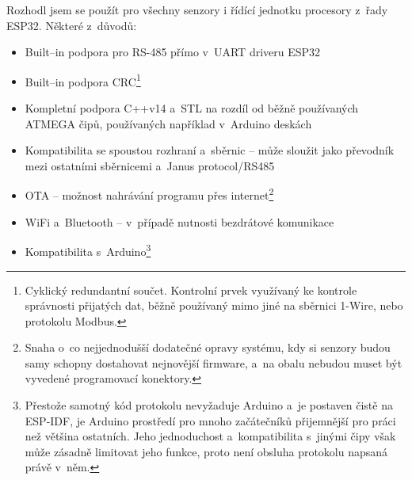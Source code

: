 Rozhodl jsem se použít pro všechny senzory i řídící jednotku procesory z~řady ESP32.
Některé z~důvodů:
\begin{itemize}
    \item Built--in podpora pro RS-485 přímo v~UART driveru ESP32
    \item Built--in podpora CRC\footnote{Cyklický redundantní součet. Kontrolní prvek využívaný ke kontrole správnosti přijatých dat, běžně používaný mimo jiné na sběrnici 1-Wire, nebo protokolu Modbus.}
    \item Kompletní podpora C++v14 a~STL na rozdíl od běžně používaných ATMEGA čipů, používaných například v~Arduino deskách
    \item Kompatibilita se spoustou rozhraní a~sběrnic -- může sloužit jako převodník mezi ostatními sběrnicemi a~Janus protocol/RS485
    \item OTA -- možnost nahrávání programu přes internet\footnote{Snaha o~co nejjednodušší dodatečné opravy systému, kdy si senzory budou samy schopny dostahovat nejnovější firmware, a~na obalu nebudou muset být vyvedené programovací konektory.}
    \item WiFi a~Bluetooth -- v~případě nutnosti bezdrátové komunikace
    \item Kompatibilita s~Arduino\footnote{Přestože samotný kód protokolu nevyžaduje Arduino a~je postaven čistě na ESP-IDF, je Arduino prostředí pro mnoho začátečníků přijemnější pro práci než většina ostatních. Jeho jednoduchost a~kompatibilita s~jinými čipy však může zásadně limitovat jeho funkce, proto není obsluha protokolu napsaná právě v~něm.}
\end{itemize}